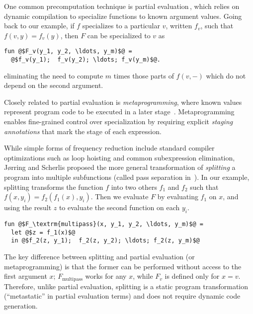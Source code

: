 One common precomputation technique is partial
evaluation\,\cite{futamura71,jones96}, which relies on dynamic
compilation to specialize functions to known argument values. Going
back to our example, if $f$ specializes to a particular $v$, written
$f_v$, such that $f(v,y) = f_v(y)$, then $F$ can be specialized to $v$
as
\begin{lstlisting}
fun @$F_v(y_1, y_2, \ldots, y_m)$@ = 
  @$f_v(y_1);  f_v(y_2); \ldots; f_v(y_m)$@.
\end{lstlisting}
eliminating the need to compute $m$ times those parts of $f(v,-)$
which do not depend on the second argument.

Closely related to partial evaluation is {\em metaprogramming}, where
known values represent program code to be executed in a later stage
\,\cite{davies96,Taha97,DP01-modal,NP05-nn}. Metaprogramming enables
fine-grained control over specialization by requiring explicit
\emph{staging annotations} that mark the stage of each expression.




While simple forms of frequency reduction include standard compiler
optimizations such as loop hoisting and common subexpression
elimination, J{\o}rring and Scherlis proposed the more general
transformation of {\em splitting} a program into multiple subfunctions
(called pass separation in \,\cite{JS86-staging}). In our example,
splitting transforms the function $f$ into two others $f_1$ and $f_2$
such that $f(x,y_i) = f_2(f_1(x),y_i)$. Then we evaluate $F$ by
evaluating $f_1$ on $x$, and using the result $z$ to evaluate
the second function on each $y_i$.
%
\begin{lstlisting}
fun @$F_\textrm{multipass}(x, y_1, y_2, \ldots, y_m)$@ = 
  let @$z = f_1(x)$@
  in @$f_2(z, y_1);  f_2(z, y_2); \ldots; f_2(z, y_m)$@
\end{lstlisting}
%
The key difference between splitting and partial evaluation (or
metaprogramming) is that the former can be performed without access to
the first argument $x$; $F_\textrm{multipass}$ works for any $x$,
while $F_v$ is defined only for $x=v$.  Therefore, unlike partial
evaluation, splitting is a static program transformation
(``metastatic'' in partial evaluation terms) and does not require
dynamic code generation.

